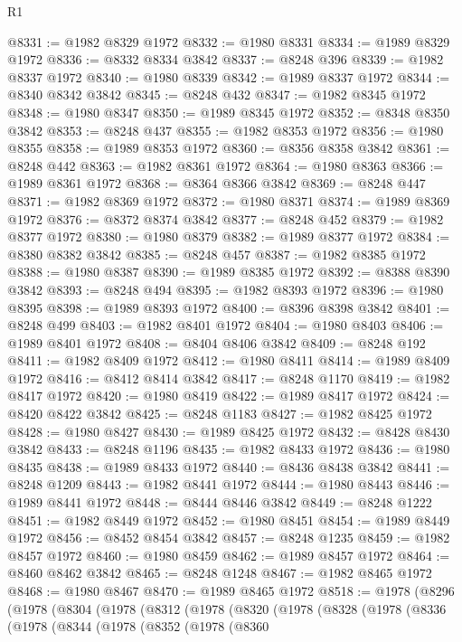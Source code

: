\begin{lexlean}{R1}
\begin{coremodule}
@8331 := @1982 @8329 @1972
@8332 := @1980 @8331
@8334 := @1989 @8329 @1972
@8336 := @8332 @8334 @3842
@8337 := @8248 @396
@8339 := @1982 @8337 @1972
@8340 := @1980 @8339
@8342 := @1989 @8337 @1972
@8344 := @8340 @8342 @3842
@8345 := @8248 @432
@8347 := @1982 @8345 @1972
@8348 := @1980 @8347
@8350 := @1989 @8345 @1972
@8352 := @8348 @8350 @3842
@8353 := @8248 @437
@8355 := @1982 @8353 @1972
@8356 := @1980 @8355
@8358 := @1989 @8353 @1972
@8360 := @8356 @8358 @3842
@8361 := @8248 @442
@8363 := @1982 @8361 @1972
@8364 := @1980 @8363
@8366 := @1989 @8361 @1972
@8368 := @8364 @8366 @3842
@8369 := @8248 @447
@8371 := @1982 @8369 @1972
@8372 := @1980 @8371
@8374 := @1989 @8369 @1972
@8376 := @8372 @8374 @3842
@8377 := @8248 @452
@8379 := @1982 @8377 @1972
@8380 := @1980 @8379
@8382 := @1989 @8377 @1972
@8384 := @8380 @8382 @3842
@8385 := @8248 @457
@8387 := @1982 @8385 @1972
@8388 := @1980 @8387
@8390 := @1989 @8385 @1972
@8392 := @8388 @8390 @3842
@8393 := @8248 @494
@8395 := @1982 @8393 @1972
@8396 := @1980 @8395
@8398 := @1989 @8393 @1972
@8400 := @8396 @8398 @3842
@8401 := @8248 @499
@8403 := @1982 @8401 @1972
@8404 := @1980 @8403
@8406 := @1989 @8401 @1972
@8408 := @8404 @8406 @3842
@8409 := @8248 @192
@8411 := @1982 @8409 @1972
@8412 := @1980 @8411
@8414 := @1989 @8409 @1972
@8416 := @8412 @8414 @3842
@8417 := @8248 @1170
@8419 := @1982 @8417 @1972
@8420 := @1980 @8419
@8422 := @1989 @8417 @1972
@8424 := @8420 @8422 @3842
@8425 := @8248 @1183
@8427 := @1982 @8425 @1972
@8428 := @1980 @8427
@8430 := @1989 @8425 @1972
@8432 := @8428 @8430 @3842
@8433 := @8248 @1196
@8435 := @1982 @8433 @1972
@8436 := @1980 @8435
@8438 := @1989 @8433 @1972
@8440 := @8436 @8438 @3842
@8441 := @8248 @1209
@8443 := @1982 @8441 @1972
@8444 := @1980 @8443
@8446 := @1989 @8441 @1972
@8448 := @8444 @8446 @3842
@8449 := @8248 @1222
@8451 := @1982 @8449 @1972
@8452 := @1980 @8451
@8454 := @1989 @8449 @1972
@8456 := @8452 @8454 @3842
@8457 := @8248 @1235
@8459 := @1982 @8457 @1972
@8460 := @1980 @8459
@8462 := @1989 @8457 @1972
@8464 := @8460 @8462 @3842
@8465 := @8248 @1248
@8467 := @1982 @8465 @1972
@8468 := @1980 @8467
@8470 := @1989 @8465 @1972
@8518 := @1978
    (@8296
      (@1978
        (@8304
          (@1978
            (@8312
              (@1978
                (@8320
                  (@1978
                    (@8328
                      (@1978
                        (@8336
                          (@1978
                            (@8344
                              (@1978
                                (@8352
                                  (@1978
                                    (@8360

\end{coremodule}
\end{lexlean}
